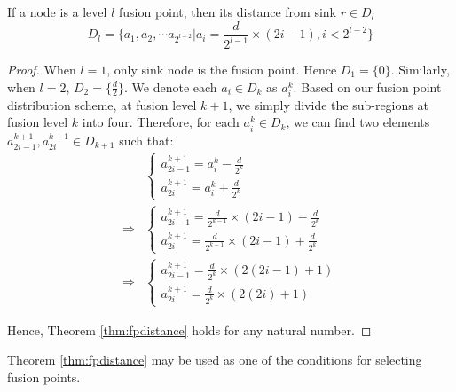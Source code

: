\begin{theorem}
\label{thm:fpdistance}
If a node is a level \(l\) fusion point, then its distance from sink \(r \in D_l\)
\[
D_l=\{a_1, a_2, \cdots a_{2^{l-2}}|a_i=\frac{d}{2^{l-1}} \times (2i-1),i<2^{l-2}\}
\]
\end{theorem}
\begin{proof}
When \(l=1\), only sink node is the fusion point. Hence \(D_1=\{0\}\). Similarly, when \(l=2\), \(D_2=\{\frac{d}{2}\}\). We denote each \(a_i \in D_k\) as \(a_i^k\). Based on our fusion point distribution scheme, at fusion level \(k+1\), we simply divide the sub-regions at fusion level \(k\) into four. Therefore, for each \(a_i^k \in D_k\), we can find two elements \(a_{2i-1}^{k+1}, a_{2i}^{k+1} \in D_{k+1}\) such that:
\begin{align*}
&\left\{
\begin{array}{l}
a_{2i-1}^{k+1}=a_i^k-\frac{d}{2^k}\\
a_{2i}^{k+1}=a_i^k+\frac{d}{2^k}
\end{array}
\right.\\
\Rightarrow
&\left\{
\begin{array}{l}
a_{2i-1}^{k+1}=\frac{d}{2^{k-1}} \times (2i-1)-\frac{d}{2^k}\\
a_{2i}^{k+1}=\frac{d}{2^{k-1}} \times (2i-1)+\frac{d}{2^k}
\end{array}
\right.\\
\Rightarrow
&\left\{
\begin{array}{l}
a_{2i-1}^{k+1}=\frac{d}{2^{k}} \times (2(2i-1)+1)\\
a_{2i}^{k+1}=\frac{d}{2^{k}} \times (2(2i)+1)
\end{array}
\right.
\end{align*}

Hence, Theorem \ref{thm:fpdistance} holds for any natural number.
\end{proof}

Theorem \ref{thm:fpdistance} may be used as one of the conditions for selecting fusion points.